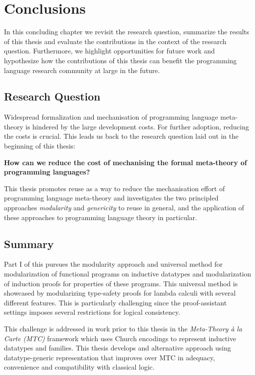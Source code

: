 \chapter{Conclusions}

In this concluding chapter we revisit the research question, summarize the
results of this thesis and evaluate the contributions in the context of the
research question. Furthermore, we highlight opportunities for future work and
hypothesize how the contributions of this thesis can benefit the programming
language research community at large in the future.

\section{Research Question}
Widespread formalization and mechanisation of programming language meta-theory
is hindered by the large development costs. For further adoption, reducing the
costs is crucial. This leads us back to the research question laid out in the
beginning of this thesis:

\begin{center}
  \begin{minipage}{0.8\columnwidth}\bf
    How can we reduce the cost of mechanising the formal meta-theory of
    programming languages?
  \end{minipage}
\end{center}

This thesis promotes reuse as a way to reduce the mechanisation effort of
programming language meta-theory and investigates the two principled approaches
\emph{modularity} and \emph{genericity} to reuse in general, and the application
of these approaches to programming language theory in particular.

\section{Summary}

Part I of this pursues the modularity approach and universal method for
modularization of functional programs on inductive datatypes and modularization
of induction proofs for properties of these programs. This universal method is
showcased by modularizing type-safety proofs for lambda calculi with several
different features. This is particularly challenging since the proof-assistant
settings imposes several restrictions for logical consistency.

This challenge is addressed in work prior to this thesis in the
\emph{Meta-Theory \`a la Carte (MTC)} \cite{mtc} framework which uses Church
encodings to represent inductive datatypes and families. This thesis develops
and alternative approach using datatype-generic representation that improves
over MTC in adequacy, convenience and compatibility with classical logic.

